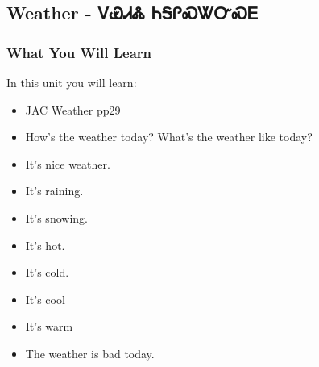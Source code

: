 \begin{multicols}
\chapter{Weather - ᏙᏯᏗᏜ ᏂᎦᎵᏍᏔᏅᏍᎬ}
\subsection{What You Will Learn}
In this unit you will learn:
\begin{itemize}
\item JAC Weather pp29
\item How's the weather today? What's the weather like today?
\item It's nice weather.
\item It's raining.
\item It's snowing.
\item It's hot.
\item It's cold.
\item It's cool
\item It's warm
\item The weather is bad today.
\end{itemize}\newpage


\end{multicols}
